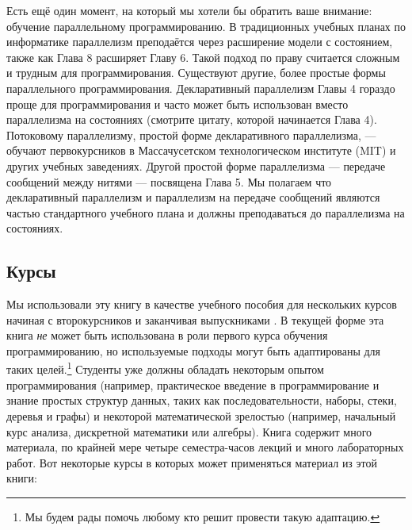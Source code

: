 Есть ещё один момент, на который мы хотели бы обратить ваше внимание: обучение параллельному программированию. В традиционных учебных планах по информатике параллелизм преподаётся через расширение модели с состоянием, также как Глава 8 расширяет Главу 6. Такой подход по праву считается сложным и трудным для программирования. Существуют другие, более простые формы параллельного программирования. Декларативный параллелизм Главы 4 гораздо проще для программирования и часто может быть использован вместо параллелизма на состояниях (смотрите цитату, которой начинается Глава 4). Потоковому параллелизму, простой форме декларативного параллелизма, --- обучают первокурсников в Массачусетском технологическом институте (MIT) и других учебных заведениях. Другой простой форме параллелизма --- передаче сообщений между нитями --- посвящена Глава 5. Мы полагаем что декларативный параллелизм и параллелизм на передаче сообщений являются частью стандартного учебного плана и должны преподаваться до параллелизма на состояниях.

\subsection*{Курсы}

Мы использовали эту книгу в качестве учебного пособия для нескольких курсов начиная с второкурсников и заканчивая выпускниками \cite{200, 199, 157}. В текущей форме эта книга \emph{не} может быть использована в роли первого курса обучения программированию, но используемые подходы могут быть адаптированы для таких целей.\footnote{Мы будем рады помочь любому кто решит провести такую адаптацию.} Студенты уже должны обладать некоторым опытом программирования (например, практическое введение в программирование и знание простых структур данных, таких как последовательности, наборы, стеки, деревья и графы) и некоторой математической зрелостью (например, начальный курс анализа, дискретной математики или алгебры). Книга содержит много материала, по крайней мере четыре семестра-часов лекций и много лабораторных работ. Вот некоторые курсы в которых может применяться материал из этой книги:

